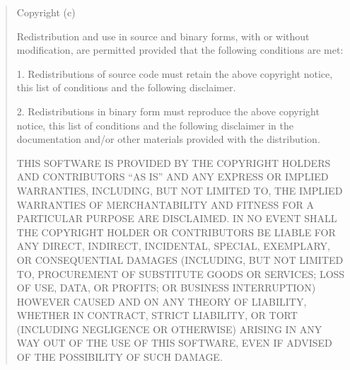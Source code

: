 \expandafter\def\csname qdissertation@licensetext@BSD-2-Clause\endcsname{%
  \begin{quote}\small\raggedright
    Copyright (c) \ifstrempty{\qdissertation@licenseyear}{\number\year}{\qdissertation@licenseyear}\ %
    \ifstrempty{\qdissertation@copyrightholder}{\qdissertation@author}{\qdissertation@copyrightholder}

    Redistribution and use in source and binary forms, with or without modification, are permitted provided that the following conditions are met:

    1. Redistributions of source code must retain the above copyright notice, this list of conditions and the following disclaimer.

    2. Redistributions in binary form must reproduce the above copyright notice, this list of conditions and the following disclaimer in the documentation and/or other materials provided with the distribution.

    THIS SOFTWARE IS PROVIDED BY THE COPYRIGHT HOLDERS AND CONTRIBUTORS ``AS IS'' AND ANY EXPRESS OR IMPLIED WARRANTIES, INCLUDING, BUT NOT LIMITED TO, THE IMPLIED WARRANTIES OF MERCHANTABILITY AND FITNESS FOR A PARTICULAR PURPOSE ARE DISCLAIMED. IN NO EVENT SHALL THE COPYRIGHT HOLDER OR CONTRIBUTORS BE LIABLE FOR ANY DIRECT, INDIRECT, INCIDENTAL, SPECIAL, EXEMPLARY, OR CONSEQUENTIAL DAMAGES (INCLUDING, BUT NOT LIMITED TO, PROCUREMENT OF SUBSTITUTE GOODS OR SERVICES; LOSS OF USE, DATA, OR PROFITS; OR BUSINESS INTERRUPTION) HOWEVER CAUSED AND ON ANY THEORY OF LIABILITY, WHETHER IN CONTRACT, STRICT LIABILITY, OR TORT (INCLUDING NEGLIGENCE OR OTHERWISE) ARISING IN ANY WAY OUT OF THE USE OF THIS SOFTWARE, EVEN IF ADVISED OF THE POSSIBILITY OF SUCH DAMAGE.
  \end{quote}%
}

